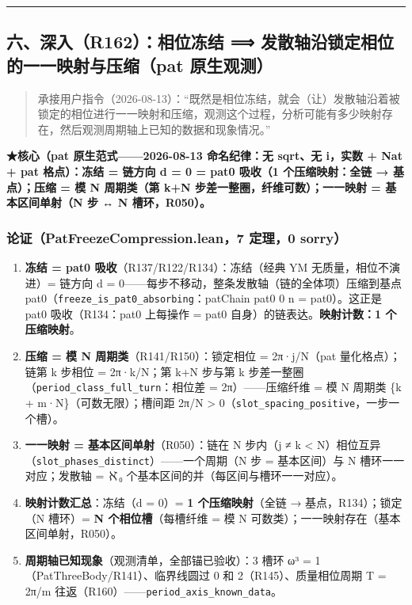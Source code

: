 \documentclass[
]{article}
\providecommand{\tightlist}{%
 \setlength{\itemsep}{0pt}\setlength{\parskip}{0pt}}
\begin{document}
\begin{center}\rule{0.5\linewidth}{0.5pt}\end{center}

\subsection{六、深入（R162）：相位冻结 ⟹
发散轴沿锁定相位的一一映射与压缩（pat
原生观测）}\label{ux516dux6df1ux5165r162ux76f8ux4f4dux51bbux7ed3-ux53d1ux6563ux8f74ux6cbfux9501ux5b9aux76f8ux4f4dux7684ux4e00ux4e00ux6620ux5c04ux4e0eux538bux7f29pat-ux539fux751fux89c2ux6d4b}

\begin{quote}
承接用户指令（2026-08-13）：``既然是相位冻结，就会（让）发散轴沿着被锁定的相位进行一一映射和压缩，观测这个过程，分析可能有多少映射存在，然后观测周期轴上已知的数据和现象情况。''
\end{quote}

\textbf{★核心（pat 原生范式------2026-08-13 命名纪律：无 sqrt、无
i，实数 + Nat + pat 格点）：冻结 = 链方向 d = 0 = pat0 吸收（1
个压缩映射：全链 → 基点）；压缩 = 模 N 周期类（第 k+N
步差一整圈，纤维可数）；一一映射 = 基本区间单射（N 步 ↔ N
槽环，R050）。}

\subsubsection{论证（PatFreezeCompression.lean，7 定理，0
sorry）}\label{ux8bbaux8bc1patfreezecompression.lean7-ux5b9aux74060-sorry}

\begin{enumerate}
\def\labelenumi{\arabic{enumi}.}
\tightlist
\item
 \textbf{冻结 = pat0 吸收}（R137/R122/R134）：冻结（经典 YM
 无质量，相位不演进）= 链方向 d =
 0------每步不移动，整条发散轴（链的全体项）压缩到基点
 pat0（\texttt{freeze\_is\_pat0\_absorbing}：patChain pat0 0 n =
 pat0）。这正是 pat0 吸收（R134：pat0 上每操作 = pat0
 自身）的链表达。\textbf{映射计数：1 个压缩映射}。
\item
 \textbf{压缩 = 模 N 周期类}（R141/R150）：锁定相位 = 2π·j/N（pat
 量化格点）；链第 k 步相位 = 2π·k/N；第 k+N 步与第 k
 步差一整圈（\texttt{period\_class\_full\_turn}：相位差 =
 2π）------压缩纤维 = 模 N 周期类 \{k + m·N\}（可数无限）；槽间距 2π/N
 \textgreater{} 0（\texttt{slot\_spacing\_positive}，一步一个槽）。
\item
 \textbf{一一映射 = 基本区间单射}（R050）：链在 N 步内（j ≠ k
 \textless{}
 N）相位互异（\texttt{slot\_phases\_distinct}）------一个周期（N 步 =
 基本区间）与 N 槽环一一对应；发散轴 = ℵ₀
 个基本区间的并（每区间与槽环一一对应）。
\item
 \textbf{映射计数汇总}：冻结（d = 0）= \textbf{1 个压缩映射}（全链 →
 基点，R134）；锁定（N 槽环）= \textbf{N 个相位槽}（每槽纤维 = 模 N
 可数类）；一一映射存在（基本区间单射，R050）。
\item
 \textbf{周期轴已知现象}（观测清单，全部锚已验收）：3 槽环 ω³ =
 1（PatThreeBody/R141）、临界线圆过 0 和 2（R145）、质量相位周期 T =
 2π/m 往返（R160）------\texttt{period\_axis\_known\_data}。
\end{enumerate}
\end{document}
